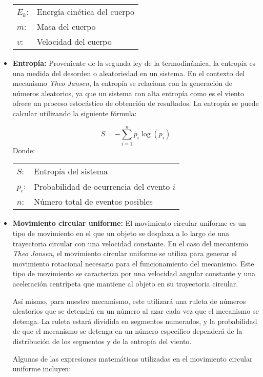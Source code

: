 \begin{itemize}
\begin{tabular}{@{}ll}
  \(E_k\): & Energía cinética del cuerpo \\
  \(m\):   & Masa del cuerpo \\
  \(v\):   & Velocidad del cuerpo \\
\end{tabular}

  \item \textbf{Entropía:} Proveniente de la segunda ley de la termodinámica, la entropía es una medida del desorden o aleatoriedad en un sistema. En el contexto del mecanismo \textit{Theo Jansen}, la entropía se relaciona con la generación de números aleatorios, ya que un sistema con alta entropía como es el viento ofrece un proceso estocástico de obtención de resultados. La entropía se puede calcular utilizando la siguiente fórmula:
  
\begin{equation}
S = -\sum_{i=1}^{n} p_i \log(p_i)
\end{equation}
Donde:  

\begin{tabular}{@{}ll}
  \(S\): & Entropía del sistema \\
  \(p_i\): & Probabilidad de ocurrencia del evento \(i\) \\
  \(n\): & Número total de eventos posibles \\
\end{tabular}

  \item \textbf{Movimiento circular uniforme:} El movimiento circular uniforme es un tipo de movimiento en el que un objeto se desplaza a lo largo de una trayectoria circular con una velocidad constante. En el caso del mecanismo \textit{Theo Jansen}, el movimiento circular uniforme se utiliza para generar el movimiento rotacional necesario para el funcionamiento del mecanismo. Este tipo de movimiento se caracteriza por una velocidad angular constante y una aceleración centrípeta que mantiene al objeto en su trayectoria circular.
  
  Así mismo, para nuestro mecamismo, este utilizará una ruleta de números aleatorios que se detendrá en un número al azar cada vez que el mecanismo se detenga. La ruleta estará dividida en segmentos numerados, y la probabilidad de que el mecanismo se detenga en un número específico dependerá de la distribución de los segmentos y de la entropía del viento.

  Algunas de las expresiones matemáticas utilizadas en el movimiento circular uniforme incluyen:


\end{itemize}
